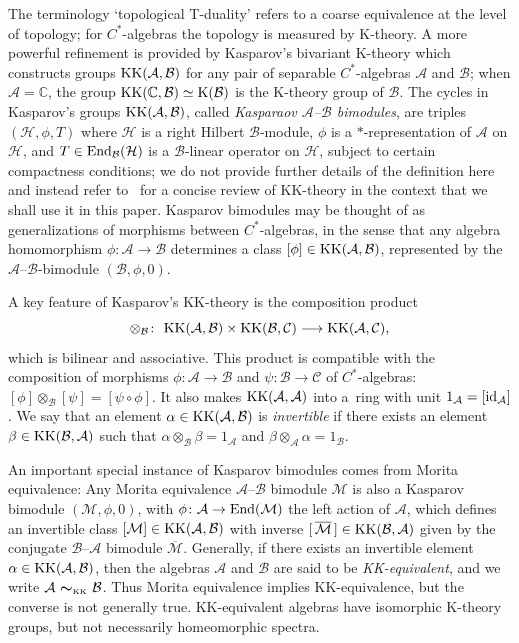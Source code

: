 \documentclass[pdftex]{sigma}
\numberwithin{equation}{section}
\newcommand{\mbf}[1]{{\boldsymbol {#1} }}
\def\Id{{\rm id}}
\newcommand{\Ccal}{\mathcal{C}}
\newcommand{\End}{{\rm End}}
\newcommand{\complex}{{\mathbb C}} %
\def\alg{{\mathcal A}}
\def\balg{{\mathcal B}}
\def\hil{{\mathcal H}}
\def\Mcal{{\mathcal M}}
\begin{document}
The terminology `topological T-duality' refers to a coarse equivalence at
the level of topology; for $C^*$-algebras the topology is measured by
K-theory. A more powerful refinement is provided by Kasparov's bivariant
K-theory which constructs groups ${\rm KK}(\alg,\balg)$ for any pair
of separable $C^*$-algebras $\alg$ and $\balg$; when $\alg=\complex$,
the group ${\rm KK}(\complex,\balg)\simeq {\rm
 K}(\balg)$ is the K-theory group of $\balg$. The cycles in
Kasparov's groups ${\rm KK}(\alg,\balg)$, called \emph{Kasparaov
 $\alg$--$\balg$ bimodules}, are triples $(\hil,\phi,T)$ where $\hil$
is a right Hilbert $\balg$-module, $\phi$ is a $*$-representation of $\alg$
on $\hil$, and $T\in\End_\balg(\hil)$ is a $\balg$-linear operator on
$\hil$, subject to certain compactness conditions; we do not
provide further details of the definition here and instead refer to~\cite{Brodzki2006} for a
concise review of KK-theory in the context that we shall use it
in this paper. Kasparov bimodules may be thought of as generalizations
of morphisms between $C^*$-algebras, in the sense that any algebra homomorphism $\phi\colon \alg\to\balg$
determines a class $[\phi]\in{\rm KK}(\alg,\balg)$, represented by the
$\alg$--$\balg$-bimodule $(\balg,\phi,0)$.

A key feature of Kasparov's KK-theory is the composition product
\[
\otimes_\balg\colon \ {\rm KK}(\alg,\balg)\times{\rm
 KK}(\balg,\Ccal)\longrightarrow{\rm KK}(\alg,\Ccal) ,
\]
which is bilinear and associative. This product is compatible with the
composition of morphisms $\phi\colon \alg\to\balg$ and $\psi\colon \balg\to\Ccal$
of $C^*$-algebras: $[\phi]\otimes_\balg[\psi] = [\psi\circ\phi]$. It
also makes ${\rm KK}(\alg,\alg)$ into a~ring with unit
$1_\alg=[\Id_\alg]$. We say that an element $\alpha\in{\rm
 KK}(\alg,\balg)$ is \emph{invertible} if there exists an element
$\beta\in{\rm KK}(\balg,\alg)$ such that
$\alpha\otimes_\balg\beta=1_\alg$ and
$\beta\otimes_\alg\alpha=1_\balg$.

An important special instance of Kasparov
bimodules comes from Morita equivalence: Any Morita equivalence
$\alg$--$\balg$ bimodule $\Mcal$ is also a Kasparov bimodule
$(\Mcal,\phi,0)$, with $\phi\colon \alg\to\End(\Mcal)$ the left action of
$\alg$, which defines an invertible class $[\Mcal]\in{\rm
 KK}(\alg,\balg)$ with inverse $[\,\overline{\Mcal}\,]\in{\rm
 KK}(\balg,\alg)$ given by the conjugate $\balg$--$\alg$ bimodule
$\overline{\Mcal}$. Generally, if there exists an invertible element
$\alpha\in{\rm KK}(\alg,\balg)$, then the algebras $\alg$ and $\balg$
are said to be \emph{{KK}-equivalent}, and we write $\alg\
\mbf\sim_{\text{\tiny{KK}}}\ \balg$. Thus Morita equivalence implies
KK-equivalence, but the converse is not generally true. KK-equivalent algebras have isomorphic
K-theory groups, but not necessarily homeomorphic spectra.
\end{document}
